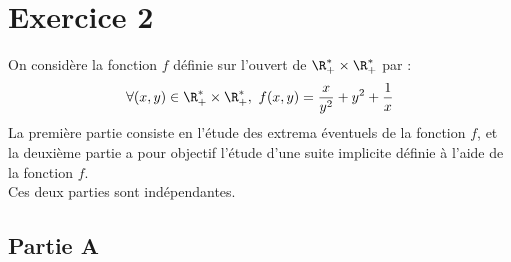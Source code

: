 \documentclass[11pt]{article}%
\begin{document}
\section*{Exercice 2}

\noindent
On considère la fonction $f$ définie sur l'ouvert de $\R_+^{*} \times
\R_+^{*}$ par :
\[
\forall (x,y) \in \R_+^{*} \times \R_+^{*}, \ f(x,y) = \dfrac{x}{y^2}
+ y^2 + \dfrac{1}{x}
\]
La première partie consiste en l'étude des extrema éventuels de la
fonction $f$, et la deuxième partie a pour objectif l'étude d'une
suite implicite définie à l'aide de la fonction $f$.\\
Ces deux parties sont indépendantes.

\subsection*{Partie A}
\end{document}
